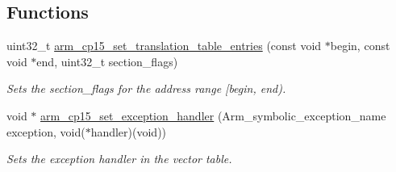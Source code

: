 \subsection*{Functions}
\begin{DoxyCompactItemize}
\item 
uint32\+\_\+t \mbox{\hyperlink{group__RTEMSScoreCPUARMCP15_gab76cb317225e4db5d2db0d8e6b578989}{arm\+\_\+cp15\+\_\+set\+\_\+translation\+\_\+table\+\_\+entries}} (const void $\ast$begin, const void $\ast$end, uint32\+\_\+t section\+\_\+flags)
\begin{DoxyCompactList}\small\item\em Sets the {\itshape section\+\_\+flags} for the address range \mbox{[}{\itshape begin}, {\itshape end}). \end{DoxyCompactList}\item 
void $\ast$ \mbox{\hyperlink{group__RTEMSScoreCPUARMCP15_gacda151e27e8a36daac7101d37ad26f69}{arm\+\_\+cp15\+\_\+set\+\_\+exception\+\_\+handler}} (Arm\+\_\+symbolic\+\_\+exception\+\_\+name exception, void($\ast$handler)(void))
\begin{DoxyCompactList}\small\item\em Sets the {\itshape exception} {\itshape handler} in the vector table. \end{DoxyCompactList}\end{DoxyCompactItemize}
